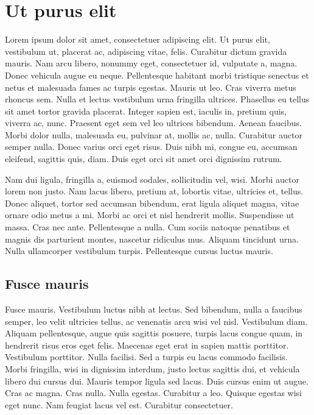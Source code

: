 
\appendix

\chapter{Ut purus elit}

Lorem ipsum dolor sit amet, consectetuer adipiscing elit. Ut purus
elit, vestibulum ut, placerat ac, adipiscing vitae, felis. Curabitur
dictum gravida mauris. Nam arcu libero, nonummy eget, consectetuer id,
vulputate a, magna. Donec vehicula augue eu neque. Pellentesque
habitant morbi tristique senectus et netus et malesuada fames ac
turpis egestas. Mauris ut leo. Cras viverra metus rhoncus sem. Nulla
et lectus vestibulum urna fringilla ultrices. Phasellus eu tellus sit
amet tortor gravida placerat. Integer sapien est, iaculis in, pretium
quis, viverra ac, nunc. Praesent eget sem vel leo ultrices
bibendum. Aenean faucibus. Morbi dolor nulla, malesuada eu, pulvinar
at, mollis ac, nulla. Curabitur auctor semper nulla.  Donec varius
orci eget risus. Duis nibh mi, congue eu, accumsan eleifend, sagittis
quis, diam. Duis eget orci sit amet orci dignissim rutrum.

Nam dui ligula, fringilla a, euismod sodales, sollicitudin vel,
wisi. Morbi auctor lorem non justo. Nam lacus libero, pretium at,
lobortis vitae, ultricies et, tellus. Donec aliquet, tortor sed
accumsan bibendum, erat ligula aliquet magna, vitae ornare odio metus
a mi. Morbi ac orci et nisl hendrerit mollis. Suspendisse ut
massa. Cras nec ante. Pellentesque a nulla.  Cum sociis natoque
penatibus et magnis dis parturient montes, nascetur ridiculus
mus. Aliquam tincidunt urna. Nulla ullamcorper vestibulum
turpis. Pellentesque cursus luctus mauris.

\section{Fusce mauris}

Fusce mauris. Vestibulum luctus nibh at lectus. Sed bibendum, nulla a
faucibus semper, leo velit ultricies tellus, ac venenatis arcu wisi
vel nisl.  Vestibulum diam. Aliquam pellentesque, augue quis sagittis
posuere, turpis lacus congue quam, in hendrerit risus eros eget
felis. Maecenas eget erat in sapien mattis porttitor. Vestibulum
porttitor. Nulla facilisi.  Sed a turpis eu lacus commodo
facilisis. Morbi fringilla, wisi in dignissim interdum, justo lectus
sagittis dui, et vehicula libero dui cursus dui. Mauris tempor ligula
sed lacus. Duis cursus enim ut augue. Cras ac magna.  Cras
nulla. Nulla egestas. Curabitur a leo. Quisque egestas wisi eget
nunc. Nam feugiat lacus vel est. Curabitur consectetuer.


